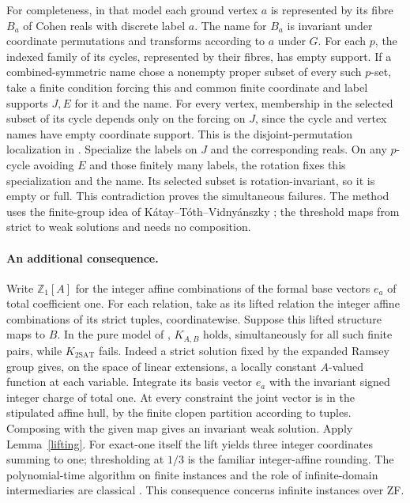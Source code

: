 \documentclass[11pt]{article}
\begin{document}
For completeness, in that model each ground vertex $a$ is represented by its fibre $B_a$ of Cohen reals with discrete label $a$. The name for $B_a$ is invariant under coordinate permutations and transforms according to $a$ under $G$. For each $p$, the indexed family of its cycles, represented by their fibres, has empty support. If a combined-symmetric name chose a nonempty proper subset of every such $p$-set, take a finite condition forcing this and common finite coordinate and label supports $J,E$ for it and the name. For every vertex, membership in the selected subset of its cycle depends only on the forcing on $J$, since the cycle and vertex names have empty coordinate support. This is the disjoint-permutation localization in \cite{companion}. Specialize the labels on $J$ and the corresponding reals. On any $p$-cycle avoiding $E$ and those finitely many labels, the rotation fixes this specialization and the name. Its selected subset is rotation-invariant, so it is empty or full. This contradiction proves the simultaneous failures. The method uses the finite-group idea of K\'atay--T\'oth--Vidny\'anszky \cite{ktv}; the threshold maps from strict to weak solutions and needs no composition.

\paragraph{An additional consequence.}
Write $\mathbb Z_1[A]$ for the integer affine combinations of the formal base vectors $e_a$ of total coefficient one. For each relation, take as its lifted relation the integer affine combinations of its strict tuples, coordinatewise. Suppose this lifted structure maps to $B$. In the pure model of \cite{companion}, $K_{A,B}$ holds, simultaneously for all such finite pairs, while $K_{2\mathrm{SAT}}$ fails. Indeed a strict solution fixed by the expanded Ramsey group gives, on the space of linear extensions, a locally constant $A$-valued function at each variable. Integrate its basis vector $e_a$ with the invariant signed integer charge of total one. At every constraint the joint vector is in the stipulated affine hull, by the finite clopen partition according to tuples. Composing with the given map gives an invariant weak solution. Apply Lemma~\ref{lifting}. For exact-one itself the lift yields three integer coordinates summing to one; thresholding at $1/3$ is the familiar integer-affine rounding. The polynomial-time algorithm on finite instances and the role of infinite-domain intermediaries are classical \cite{bg,barto}. This consequence concerns infinite instances over ZF.
\end{document}
